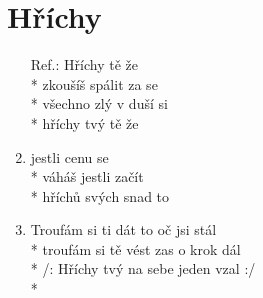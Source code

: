 \section{Hříchy}
\begin{enumerate}
\item[Ref.:] Hříchy  tě  že \\*
zkoušíš spálit  za se \\*
všechno zlý v duší  si   \\*
hříchy tvý tě  že 
\item {} jestli  cenu se  \\*
váháš jestli  začít  \\*
hříchů svých snad  to 
\item Troufám si ti dát to oč jsi stál \\*
troufám si tě vést zas o krok dál \\*
/: Hříchy tvý na sebe jeden vzal :/ \\*
\end{enumerate}
